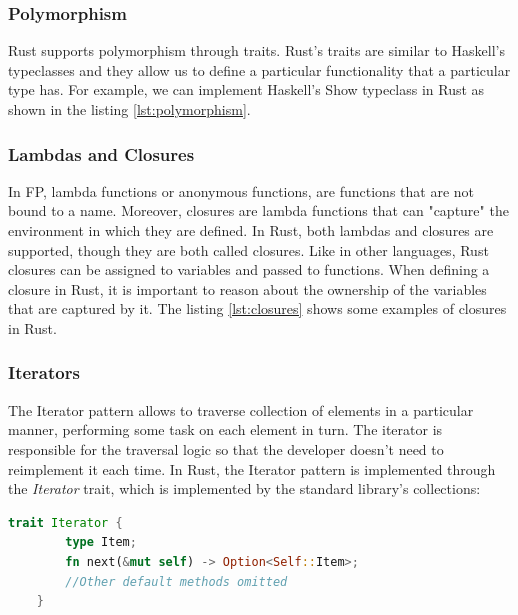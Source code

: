 

\subsubsection{Polymorphism}
Rust supports polymorphism through traits. Rust's traits are similar to Haskell's typeclasses and they allow us to define a particular functionality that a particular type has.
For example, we can implement Haskell's Show typeclass in Rust as shown in the listing \ref{lst:polymorphism}.



\subsubsection{Lambdas and Closures}
In FP, lambda functions or anonymous functions, are functions that are not bound to a name. Moreover, closures are lambda functions that can "capture" the environment in which they are defined.
In Rust, both lambdas and closures are supported, though they are both called closures. Like in other languages, Rust closures can be assigned to variables and passed to functions.
When defining a closure in Rust, it is important to reason about the ownership of the variables that are captured by it. The listing \ref{lst:closures} shows some examples of closures in Rust.



\subsubsection{Iterators}
The Iterator pattern allows to traverse collection of elements in a particular manner, performing some task on each element in turn. The iterator is responsible for the traversal logic
so that the developer doesn't need to reimplement it each time. In Rust, the Iterator pattern is implemented through the \textit{Iterator} trait, which is implemented by the standard library's collections:

\begin{lstlisting}[language=Rust]
    trait Iterator {
        type Item;
        fn next(&mut self) -> Option<Self::Item>;
        //Other default methods omitted
    }
\end{lstlisting}

